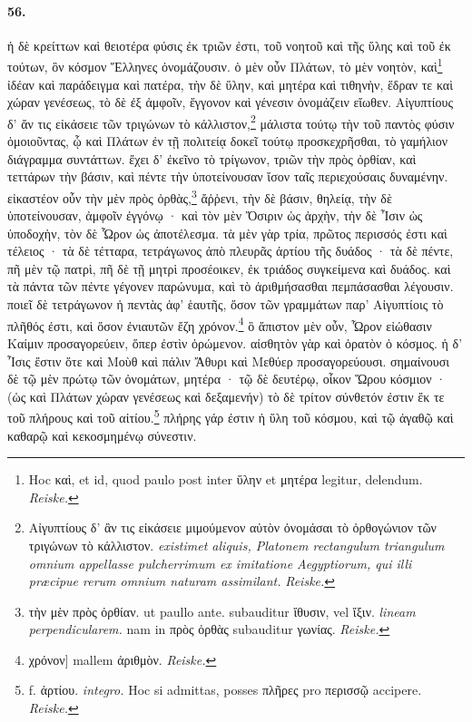 \documentclass[a4paper, 11pt, oneside, polutonikogreek, german, landscape]{article}
\begin{document}
\paragraph{56.}
ἡ δὲ κρείττων καὶ θειοτέρα φύσις ἐκ τριῶν ἐστι, τοῦ νοητοῦ καὶ τῆς ὕλης καὶ τοῦ ἐκ τούτων, ὃν κόσμον Ἕλληνες ὀνομάζουσιν. ὁ μὲν οὖν Πλάτων, τὸ μὲν νοητὸν, καὶ\footnote{Hoc καὶ, et id, quod paulo post inter ὕλην et μητέρα legitur, delendum. \emph{Reiske.}} ἰδέαν καὶ παράδειγμα καὶ πατέρα, τὴν δὲ ὕλην, καὶ μητέρα καὶ τιθηνὴν, ἕδραν τε καὶ χώραν γενέσεως, τὸ δὲ ἐξ ἀμφοῖν, ἔγγονον καὶ γένεσιν ὀνομάζειν εἴωθεν. Αἰγυπτίους δ' ἄν τις εἰκάσειε τῶν τριγώνων τὸ κάλλιστον,\footnote{Αἰγυπτίους δ' ἂν τις εἰκάσειε μιμούμενον αὐτὸν ὀνομάσαι τὸ ὀρθογώνιον τῶν τριγώνων τὸ κάλλιστον. \emph{existimet aliquis, Platonem rectangulum triangulum omnium appellasse pulcherrimum ex imitatione Aegyptiorum, qui illi præcipue rerum omnium naturam assimilant.} \emph{Reiske.}} μάλιστα τούτῳ τὴν τοῦ παντὸς φύσιν ὁμοιοῦντας, ᾧ καὶ Πλάτων ἐν τῇ πολιτείᾳ δοκεῖ τούτῳ προσκεχρῆσθαι, τὸ γαμήλιον διάγραμμα συντάττων. ἔχει δ' ἐκεῖνο τὸ τρίγωνον, τριῶν τὴν πρὸς ὀρθίαν, καὶ τεττάρων τὴν βάσιν, καὶ πέντε τὴν ὑποτείνουσαν ἴσον ταῖς περιεχούσαις δυναμένην. εἰκαστέον οὖν τὴν μὲν πρὸς ὀρθὰς,\footnote{τὴν μὲν πρὸς ὀρθίαν. ut paullo ante. subauditur ἴθυσιν, vel ἴξιν. \emph{lineam perpendicularem.} nam in πρὸς ὀρθὰς subauditur γωνίας. \emph{Reiske.} } ἄῤῥενι, τὴν δὲ βάσιν, θηλείᾳ, τὴν δὲ ὑποτείνουσαν, ἀμφοῖν ἐγγόνῳ · καὶ τὸν μὲν Ὄσιριν ὡς ἀρχὴν, τὴν δὲ Ἶσιν ὡς ὑποδοχὴν, τὸν δὲ Ὧρον ὡς ἀποτέλεσμα. τὰ μὲν γὰρ τρία, πρῶτος περισσός ἐστι καὶ τέλειος · τὰ δὲ τέτταρα, τετράγωνος ἀπὸ πλευρᾶς ἀρτίου τῆς δυάδος · τὰ δὲ πέντε, πῆ μὲν τῷ πατρὶ, πῆ δὲ τῇ μητρὶ προσέοικεν, ἐκ τριάδος συγκείμενα καὶ δυάδος. καὶ τὰ πάντα τῶν πέντε γέγονεν παρώνυμα, καὶ τὸ ἀριθμήσασθαι πεμπάσασθαι λέγουσιν. ποιεῖ δὲ τετράγωνον ἡ πεντὰς ἀφ' ἑαυτῆς, ὅσον τῶν γραμμάτων παρ' Αἰγυπτίοις τὸ πλῆθός ἐστι, καὶ ὅσον ἐνιαυτῶν ἔζη χρόνον.\footnote{χρόνον] mallem ἀριθμὸν. \emph{Reiske.}} ὃ ἄπιστον μὲν οὖν, Ὧρον εἰώθασιν Καίμιν προσαγορεύειν, ὅπερ ἐστὶν ὁρώμενον. αἰσθητὸν γὰρ καὶ ὁρατὸν ὁ κόσμος. ἡ δ' Ἶσις ἔστιν ὅτε καὶ Μοὺθ καὶ πάλιν Ἄθυρι καὶ Μεθύερ προσαγορεύουσι. σημαίνουσι δὲ τῷ μὲν πρώτῳ τῶν ὀνομάτων, μητέρα · τῷ δὲ δευτέρῳ, οἶκον Ὥρου κόσμιον · (ὡς καὶ Πλάτων χώραν γενέσεως καὶ δεξαμενήν) τὸ δὲ τρίτον σύνθετόν ἐστιν ἔκ τε τοῦ πλήρους καὶ τοῦ αἰτίου.\footnote{f. ἀρτίου. \emph{integro.} Hoc si admittas, posses πλῆρες pro περισσῷ accipere. \emph{Reiske.}} πλήρης γάρ ἐστιν ἡ ὕλη τοῦ κόσμου, καὶ τῷ ἀγαθῷ καὶ καθαρῷ καὶ κεκοσμημένῳ σύνεστιν.
\end{document}
